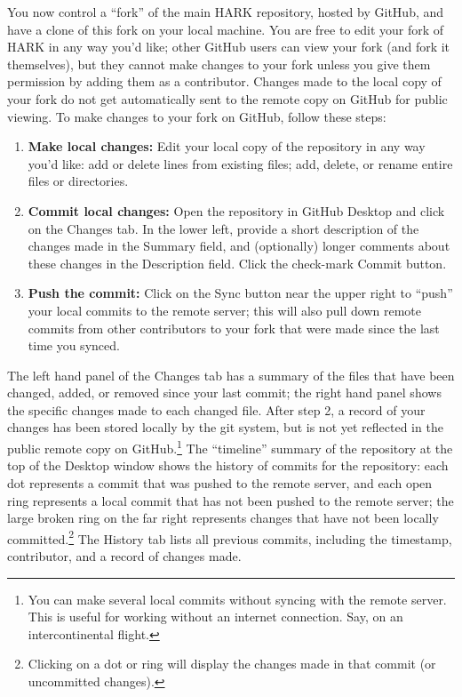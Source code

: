 \documentclass[12pt,titlepage,letterpaper]{econtex}
\begin{document}
You now control a ``fork'' of the main HARK repository, hosted by GitHub, and have a clone of this fork on your local machine.  You are free to edit your fork of HARK in any way you'd like; other GitHub users can view your fork (and fork it themselves), but they cannot make changes to your fork unless you give them permission by adding them as a contributor.  Changes made to the local copy of your fork do not get automatically sent to the remote copy on GitHub for public viewing.  To make changes to your fork on GitHub, follow these steps:
\begin{enumerate}
\item \textbf{Make local changes:} Edit your local copy of the repository in any way you'd like: add or delete lines from existing files; add, delete, or rename entire files or directories.

\item \textbf{Commit local changes:} Open the repository in GitHub Desktop and click on the Changes tab.  In the lower left, provide a short description of the changes made in the Summary field, and (optionally) longer comments about these changes in the Description field.  Click the check-mark Commit button.

\item \textbf{Push the commit:} Click on the Sync button near the upper right to ``push'' your local commits to the remote server; this will also pull down remote commits from other contributors to your fork that were made since the last time you synced.
\end{enumerate}

The left hand panel of the Changes tab has a summary of the files that have been changed, added, or removed since your last commit; the right hand panel shows the specific changes made to each changed file.  After step 2, a record of your changes has been stored locally by the git system, but is not yet reflected in the public remote copy on GitHub.\footnote{You can make several local commits without syncing with the remote server.  This is useful for working without an internet connection.  Say, on an intercontinental flight.}  The ``timeline'' summary of the repository at the top of the Desktop window shows the history of commits for the repository: each dot represents a commit that was pushed to the remote server, and each open ring represents a local commit that has not been pushed to the remote server; the large broken ring on the far right represents changes that have not been locally committed.\footnote{Clicking on a dot or ring will display the changes made in that commit (or uncommitted changes).}  The History tab lists all previous commits, including the timestamp, contributor, and a record of changes made.
\end{document}
